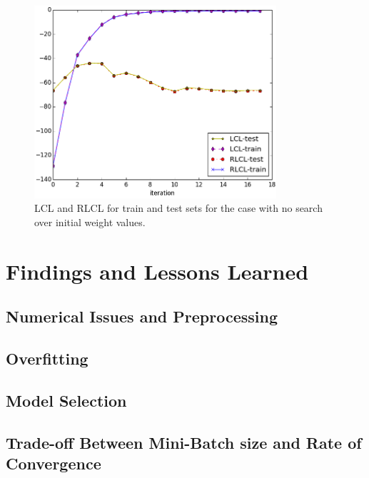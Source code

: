 \documentclass[twoside,12pt]{article}
\begin{document}
\begin{figure}[h!]
\label{figNoBeta0}
\centering
\includegraphics[width=0.8\textwidth]{nobeta0.png}
\caption{LCL and RLCL for train and test sets for the case with no search over initial weight values.}
\end{figure}



\section{Findings and Lessons Learned}
\subsection{Numerical Issues and Preprocessing}
\subsection{Overfitting}
\subsection{Model Selection}
\subsection{Trade-off Between Mini-Batch size and Rate of Convergence}
\end{document}
